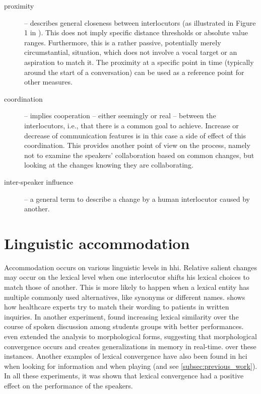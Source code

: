 \begin{description}
	\item[proximity] -- describes general closeness between interlocutors (as illustrated in Figure 1 in \citet{Levitan2011measuring}).
	This does not imply specific distance thresholds or absolute value ranges.
	Furthermore, this is a rather passive, potentially merely circumstantial, situation, which does not involve a vocal target or an aspiration to match it.
	The proximity at a specific point in time (typically around the start of a conversation) can be used as a reference point for other measures.
	
	\item[coordination] -- implies cooperation -- either seemingly or real -- between the interlocutors, i.e., that there is a common goal to achieve.
	Increase or decrease of communication features is in this case a side of effect of this coordination.
	This provides another point of view on the process, namely not to examine the speakers' collaboration based on common changes, but looking at the changes knowing they are collaborating.
	
	\item[inter-speaker influence] -- a general term to describe a change by a human interlocutor caused by another.
\end{description}

\section{Linguistic accommodation}
\label{sec:linguistic_accommodation}

Accommodation occurs on various linguistic levels in \ac{hhi}.
Relative salient changes may occur on the lexical level when one interlocutor shifts his lexical choices to match those of another.
This is more likely to happen when a lexical entity has multiple commonly used alternatives, like synonyms or different names.
\citet{Jucks2008lexical} shows how healthcare experts try to match their wording to patients in written inquiries.
In another experiment, \citet{Friedberg2012lexical} found increasing lexical similarity over the course of spoken discussion among students groups with better performances.
\citet{Racz2020morphological} even extended the analysis to morphological forms, suggesting that morphological convergence occurs and creates generalizations in memory in real-time.
over these instances.
Another examples of lexical convergence have also been found in \ac{hci} when looking for information \citep{Lopes2013lexical} and when playing \citep{Bergqvist2020nontrivial} (and see \cref{subsec:previous_work}).
In all these experiments, it was shown that lexical convergence had a positive effect on the performance of the speakers.

